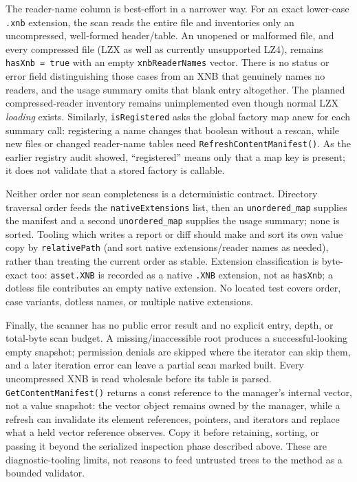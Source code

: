 The reader-name column is best-effort in a narrower way. For an exact lower-case
\texttt{.xnb} extension, the scan reads the entire file and inventories only an uncompressed,
well-formed header/table. An unopened or malformed file, and every compressed file (LZX as well
as currently unsupported LZ4), remains \texttt{hasXnb = true} with an empty
\texttt{xnbReaderNames} vector. There is no status or error field distinguishing those cases
from an XNB that genuinely names no readers, and the usage summary omits that blank entry
altogether. The planned compressed-reader inventory remains unimplemented even though normal
LZX \emph{loading} exists. Similarly, \texttt{isRegistered} asks the global factory map anew
for each summary call: registering a name changes that boolean without a rescan, while new files
or changed reader-name tables need \texttt{RefreshContentManifest()}. As the earlier registry
audit showed, ``registered'' means only that a map key is present; it does not validate that a
stored factory is callable.

Neither order nor scan completeness is a deterministic contract. Directory traversal order feeds
the \texttt{nativeExtensions} list, then an \texttt{unordered\_map} supplies the manifest and a
second \texttt{unordered\_map} supplies the usage summary; none is sorted. Tooling which writes
a report or diff should make and sort its own value copy by \texttt{relativePath} (and sort native
extensions/reader names as needed), rather than treating the current order as stable. Extension
classification is byte-exact too: \texttt{asset.XNB} is recorded as a native \texttt{.XNB}
extension, not as \texttt{hasXnb}; a dotless file contributes an empty native extension. No
located test covers order, case variants, dotless names, or multiple native extensions.

Finally, the scanner has no public error result and no explicit entry, depth, or total-byte scan
budget. A missing/inaccessible root produces a successful-looking empty snapshot; permission
denials are skipped where the iterator can skip them, and a later iteration error can leave a
partial scan marked built. Every uncompressed XNB is read wholesale before its table is parsed.
\texttt{GetContentManifest()} returns a const reference to the manager's internal vector, not a
value snapshot: the vector object remains owned by the manager, while a refresh can invalidate
its element references, pointers, and iterators and replace what a held vector reference observes.
Copy it before retaining, sorting, or passing it beyond the serialized inspection phase described
above. These are diagnostic-tooling limits, not reasons to feed untrusted trees to the method as
a bounded validator.

